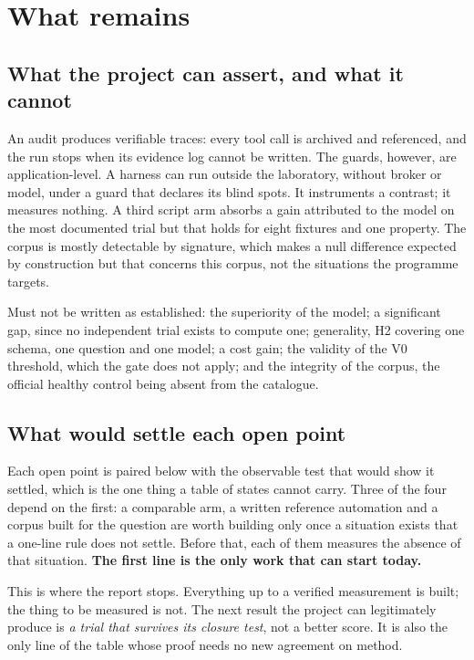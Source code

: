 \section{What remains}
\label{sec:reste}

\subsection{What the project can assert, and what it cannot}

An audit produces verifiable
traces: every tool call is archived and referenced, and the run stops when its
evidence log cannot be written. The guards, however, are application-level. A harness
can run outside the laboratory, without broker or model, under a guard that
declares its blind spots. It instruments a contrast; it measures nothing. A third
script arm absorbs a gain attributed to the model on the most documented trial but that holds for eight fixtures and one property. The corpus is mostly
detectable by signature, which makes a null difference expected by construction but that concerns this corpus, not the situations the programme targets.

Must not be written as established: the superiority of the model; a significant
gap, since no independent trial exists to compute one; generality, H2 covering
one schema, one question and one model; a cost gain; the validity of the V0
threshold, which the gate does not apply; and the integrity of the corpus, the
official healthy control being absent from the catalogue.

\subsection{What would settle each open point}
\label{sec:jusquou}

Each open point is paired below with the observable test that would show it
settled, which is the one thing a table of states cannot carry. Three of the four
depend on the first: a comparable arm, a written reference automation and a corpus
built for the question are worth building only once a situation exists that a
one-line rule does not settle. Before that, each of them measures the absence of
that situation. \textbf{The first line is the only work that can start today.}



This is where the report stops. Everything up to a verified measurement is built;
the thing to be measured is not. The next result the project can legitimately
produce is \emph{a trial that survives its closure test}, not a better score. It
is also the only line of the table whose proof needs no new agreement on method.

